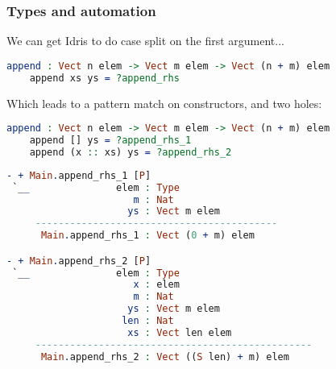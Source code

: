 \documentclass{beamer}
\begin{document}
\begin{frame}[fragile]
  \frametitle{Types and automation}

  We can get Idris to do case split on the first argument...

  \begin{lstlisting}[language=Idris]
    append : Vect n elem -> Vect m elem -> Vect (n + m) elem
    append xs ys = ?append_rhs      
  \end{lstlisting}

  \pause
  
  Which leads to a pattern match on constructors, and two holes:

  \begin{lstlisting}[language=Idris]
    append : Vect n elem -> Vect m elem -> Vect (n + m) elem
    append [] ys = ?append_rhs_1
    append (x :: xs) ys = ?append_rhs_2
  \end{lstlisting}

  \pause

  \begin{lstlisting}[language=Idris]
- + Main.append_rhs_1 [P]
 `__               elem : Type
                      m : Nat
                     ys : Vect m elem
     ------------------------------------------
      Main.append_rhs_1 : Vect (0 + m) elem

- + Main.append_rhs_2 [P]
 `__               elem : Type
                      x : elem
                      m : Nat
                     ys : Vect m elem
                    len : Nat
                     xs : Vect len elem
     ------------------------------------------------
      Main.append_rhs_2 : Vect ((S len) + m) elem
  \end{lstlisting}
\end{frame}
\end{document}
